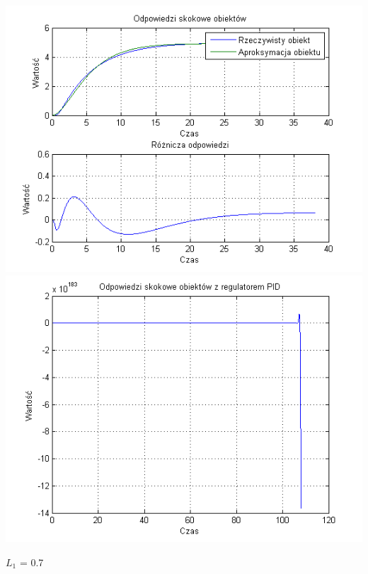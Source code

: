 \documentclass[10pt,a4paper]{article}
\begin{document}
\begin{center}
\includegraphics[scale=1]{images/dwa/skrypt_199.png}\\
\includegraphics[scale=1]{images/dwa/skrypt_200.png}\\
\end{center}
\newpage
$L_1$ = 0.7
\end{document}
